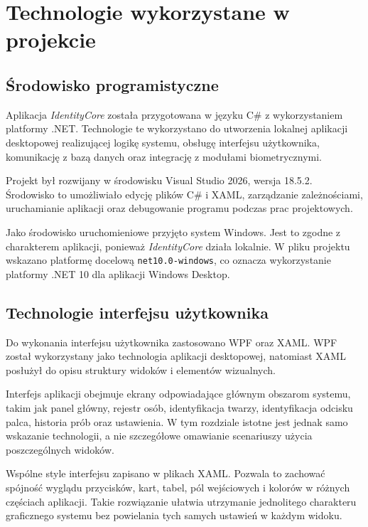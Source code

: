 \chapter{Technologie wykorzystane w projekcie}
\label{chap:technologie}

\section{Środowisko programistyczne}

Aplikacja \textit{IdentityCore} została przygotowana w języku C\# z wykorzystaniem platformy .NET. \newline Technologie te wykorzystano do utworzenia lokalnej aplikacji desktopowej realizującej logikę systemu, obsługę interfejsu użytkownika, komunikację z bazą danych oraz integrację z modułami biometrycznymi.

Projekt był rozwijany w środowisku Visual Studio 2026, wersja 18.5.2. Środowisko to umożliwiało edycję plików C\# i XAML, zarządzanie zależnościami, uruchamianie aplikacji oraz debugowanie programu podczas prac projektowych.

Jako środowisko uruchomieniowe przyjęto system Windows. Jest to zgodne z charakterem aplikacji, ponieważ \textit{IdentityCore} działa lokalnie. W pliku projektu wskazano platformę docelową \texttt{net10.0-windows}, co oznacza wykorzystanie platformy .NET 10 dla aplikacji Windows Desktop.

\section{Technologie interfejsu użytkownika}

Do wykonania interfejsu użytkownika zastosowano WPF oraz XAML. WPF został wykorzystany jako technologia aplikacji desktopowej, natomiast XAML posłużył do opisu struktury widoków i elementów wizualnych.

Interfejs aplikacji obejmuje ekrany odpowiadające głównym obszarom systemu, takim jak panel główny, rejestr osób, identyfikacja twarzy, identyfikacja odcisku palca, historia prób oraz ustawienia. W tym rozdziale istotne jest jednak samo wskazanie technologii, a nie szczegółowe omawianie scenariuszy użycia poszczególnych widoków.

Wspólne style interfejsu zapisano w plikach XAML. Pozwala to zachować spójność wyglądu przycisków, kart, tabel, pól wejściowych i kolorów w różnych częściach aplikacji. Takie rozwiązanie ułatwia utrzymanie jednolitego charakteru graficznego systemu bez powielania tych samych ustawień w każdym widoku.

